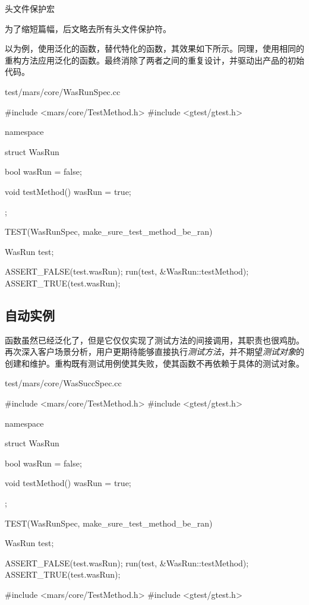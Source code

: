 \begin{content}
\begin{episode}{头文件保护宏}
\begin{content}
为了缩短篇幅，后文略去所有头文件保护符。

\end{content}
\end{episode}

以为例，使用泛化的函数，替代特化的函数，其效果如下所示。同理，使用相同的重构方法应用泛化的函数。最终消除了两者之间的重复设计，并驱动出产品的初始代码。

\begin{nodiff}{test/mars/core/WasRunSpec.cc}
\begin{c++}
#include <mars/core/TestMethod.h>
#include <gtest/gtest.h>

namespace {
  struct WasRun {
    bool wasRun = false;

    void testMethod() {
      wasRun = true;
    }
  };
}

TEST(WasRunSpec, make_sure_test_method_be_ran) {
  WasRun test;

  ASSERT_FALSE(test.wasRun);
  run(test, &WasRun::testMethod);
  ASSERT_TRUE(test.wasRun);
}
\end{c++}
\end{nodiff}

\subsection{自动实例}

函数虽然已经泛化了，但是它仅仅实现了测试方法的间接调用，其职责也很鸡肋。再次深入客户场景分析，用户更期待能够直接执行\emph{测试方法}，并不期望\emph{测试对象}的创建和维护。重构既有测试用例使其失败，使其函数不再依赖于具体的测试对象。

\begin{diff}{test/mars/core/WasSuccSpec.cc}
\begin{minicpp}
#include <mars/core/TestMethod.h>
#include <gtest/gtest.h>

namespace {
  struct WasRun {
    bool wasRun = false;

    void testMethod() {
      wasRun = true;
    }
  };
}

TEST(WasRunSpec, make_sure_test_method_be_ran) {
  WasRun test;

  ASSERT_FALSE(test.wasRun);
  run(test, &WasRun::testMethod);
  ASSERT_TRUE(test.wasRun);
}
\end{minicpp}
\tcblower
\begin{minicpp}
#include <mars/core/TestMethod.h>
#include <gtest/gtest.h>


\end{minicpp}
\end{diff}
\end{content}
